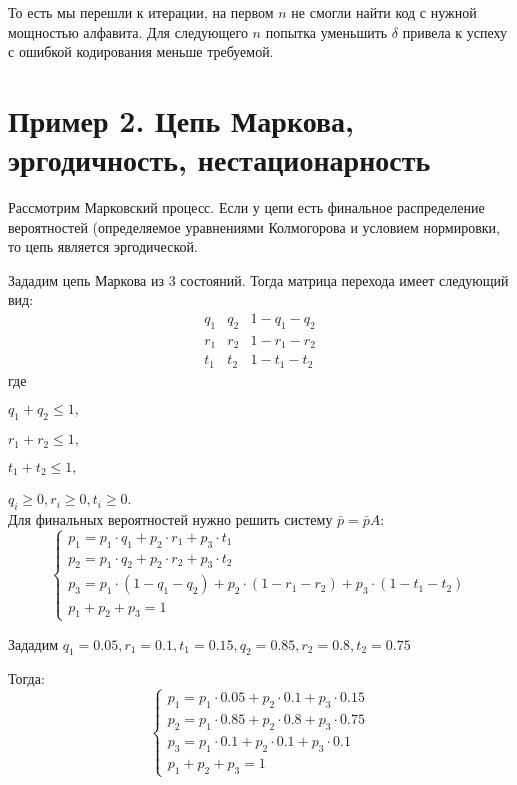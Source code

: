 \documentclass{article}
\begin{document}
То есть мы перешли к итерации, на первом $n$ не смогли найти код с нужной мощностью алфавита. Для следующего $n$ попытка уменьшить $\delta$ привела к успеху с ошибкой кодирования меньше требуемой.

\section{Пример 2. Цепь Маркова, эргодичность, нестационарность}

Рассмотрим Марковский процесс. Если у цепи есть финальное распределение вероятностей (определяемое уравнениями Колмогорова и условием нормировки, то цепь является эргодической.

Зададим цепь Маркова из 3 состояний. Тогда матрица перехода имеет следующий вид:
\begin{equation*}
\begin{matrix}
q_1 & q_2 & 1-q_1-q_2\\
r_1 & r_2 & 1-r_1-r_2\\
t_1 & t_2 & 1-t_1-t_2
\end{matrix}
\end{equation*}
где

$q_1 + q_2 \leq 1,$

$r_1 + r_2 \leq 1,$

$t_1 + t_2 \leq 1,$

$q_i \geq 0, r_i \geq 0, t_i \geq 0$.
\\

Для финальных вероятностей нужно решить систему $\bar{p}=\bar{p}A$:
\begin{equation*}
\begin{cases}
p_1 = p_1 \cdot q_1 +  p_2 \cdot r_1 + p_3 \cdot t_1\\
p_2 = p_1 \cdot q_2 +  p_2 \cdot r_2 + p_3 \cdot t_2\\
p_3 = p_1 \cdot (1 - q_1 - q_2) +  p_2 \cdot (1 - r_1 - r_2) + p_3 \cdot (1 - t_1 - t_2)\\
p_1 + p_2 + p_3 = 1
\end{cases}
\end{equation*}

Зададим $q_1 = 0.05, r_1 = 0.1, t_1 = 0.15, q_2 = 0.85, r_2 = 0.8, t_2 = 0.75$

Тогда:
\begin{equation*}
\begin{cases}
p_1 = p_1 \cdot 0.05 +  p_2 \cdot 0.1 + p_3 \cdot 0.15\\
p_2 = p_1 \cdot 0.85 +  p_2 \cdot 0.8 + p_3 \cdot 0.75\\
p_3 = p_1 \cdot 0.1 +  p_2 \cdot 0.1 + p_3 \cdot 0.1\\
p_1 + p_2 + p_3 = 1
\end{cases}
\end{equation*}
\end{document}
